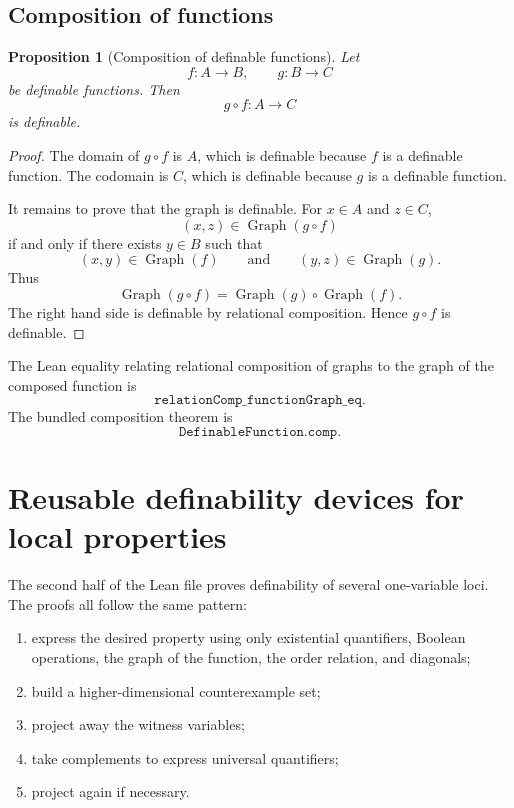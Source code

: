 \documentclass[11pt]{article}
\newtheorem{proposition}[definition]{Proposition}
\newcommand{\Graph}{\operatorname{Graph}}
\newcommand{\Lean}[1]{\texttt{#1}}
\begin{document}
\subsection{Composition of functions}

\begin{proposition}[Composition of definable functions]
Let
\[
  f:A\to B,
  \qquad
  g:B\to C
\]
be definable functions.  Then
\[
  g\circ f:A\to C
\]
is definable.
\end{proposition}

\begin{proof}
The domain of $g\circ f$ is $A$, which is definable because $f$ is a definable function.  The codomain
is $C$, which is definable because $g$ is a definable function.

It remains to prove that the graph is definable.  For $x\in A$ and $z\in C$,
\[
  (x,z)\in\Graph(g\circ f)
\]
if and only if there exists $y\in B$ such that
\[
  (x,y)\in\Graph(f)
  \qquad\text{and}\qquad
  (y,z)\in\Graph(g).
\]
Thus
\[
  \Graph(g\circ f)
  =
  \Graph(g)\circ\Graph(f).
\]
The right hand side is definable by relational composition.  Hence $g\circ f$ is definable.
\end{proof}

The Lean equality relating relational composition of graphs to the graph of the composed function is
\[
  \Lean{relationComp\_functionGraph\_eq}.
\]
The bundled composition theorem is
\[
  \Lean{DefinableFunction.comp}.
\]

\section{Reusable definability devices for local properties}

The second half of the Lean file proves definability of several one-variable loci.  The proofs all
follow the same pattern:
\begin{enumerate}[label=(\roman*)]
  \item express the desired property using only existential quantifiers, Boolean operations, the graph
  of the function, the order relation, and diagonals;
  \item build a higher-dimensional counterexample set;
  \item project away the witness variables;
  \item take complements to express universal quantifiers;
  \item project again if necessary.
\end{enumerate}
\end{document}
